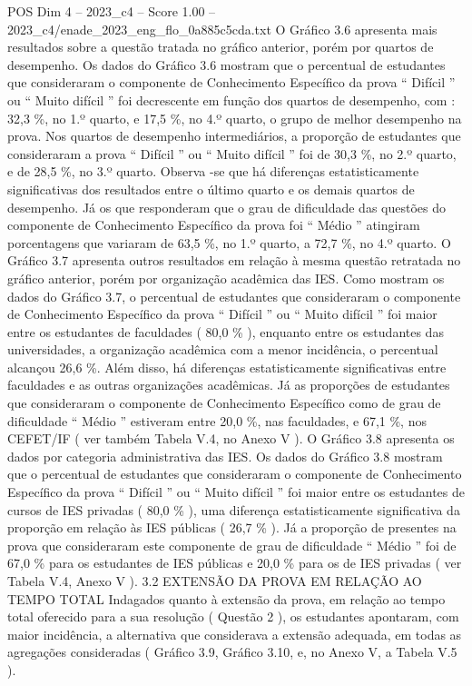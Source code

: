 \begin{textsample}{POS Dim 4 – 2023\_c4 – Score 1.00 – 2023\_c4/enade\_2023\_eng\_flo\_0a885c5cda.txt}
O Gráfico 3.6 apresenta mais resultados sobre a questão tratada no gráfico anterior, porém por quartos de desempenho.
Os dados do Gráfico 3.6 mostram que o percentual de estudantes que consideraram o componente de Conhecimento Específico da prova “ Difícil ” ou “ Muito difícil ” foi decrescente em função dos quartos de desempenho, com : 32,3 \%, no 1.º quarto, e 17,5 \%, no 4.º quarto, o grupo de melhor desempenho na prova.
Nos quartos de desempenho intermediários, a proporção de estudantes que consideraram a prova “ Difícil ” ou “ Muito difícil ” foi de 30,3 \%, no 2.º quarto, e de 28,5 \%, no 3.º quarto.
Observa -se que há diferenças estatisticamente significativas dos resultados entre o último quarto e os demais quartos de desempenho.
Já os que responderam que o grau de dificuldade das questões do componente de Conhecimento Específico da prova foi “ Médio ” atingiram porcentagens que variaram de 63,5 \%, no 1.º quarto, a 72,7 \%, no 4.º quarto.
O Gráfico 3.7 apresenta outros resultados em relação à mesma questão retratada no gráfico anterior, porém por organização acadêmica das IES.
Como mostram os dados do Gráfico 3.7, o percentual de estudantes que consideraram o componente de Conhecimento Específico da prova “ Difícil ” ou “ Muito difícil ” foi maior entre os estudantes de faculdades ( 80,0 \% ), enquanto entre os estudantes das universidades, a organização acadêmica com a menor incidência, o percentual alcançou 26,6 \%.
Além disso, há diferenças estatisticamente significativas entre faculdades e as outras organizações acadêmicas.
Já as proporções de estudantes que consideraram o componente de Conhecimento Específico como de grau de dificuldade “ Médio ” estiveram entre 20,0 \%, nas faculdades, e 67,1 \%, nos CEFET/IF ( ver também Tabela V.4, no Anexo V ).
O Gráfico 3.8 apresenta os dados por categoria administrativa das IES.
Os dados do Gráfico 3.8 mostram que o percentual de estudantes que consideraram o componente de Conhecimento Específico da prova “ Difícil ” ou “ Muito difícil ” foi maior entre os estudantes de cursos de IES privadas ( 80,0 \% ), uma diferença estatisticamente significativa da proporção em relação às IES públicas ( 26,7 \% ).
Já a proporção de presentes na prova que consideraram este componente de grau de dificuldade “ Médio ” foi de 67,0 \% para os estudantes de IES públicas e 20,0 \% para os de IES privadas ( ver Tabela V.4, Anexo V ). 3.2 EXTENSÃO DA PROVA EM RELAÇÃO AO TEMPO TOTAL Indagados quanto à extensão da prova, em relação ao tempo total oferecido para a sua resolução ( Questão 2 ), os estudantes apontaram, com maior incidência, a alternativa que considerava a extensão adequada, em todas as agregações consideradas ( Gráfico 3.9, Gráfico 3.10, e, no Anexo V, a Tabela V.5 ).

\end{textsample}
